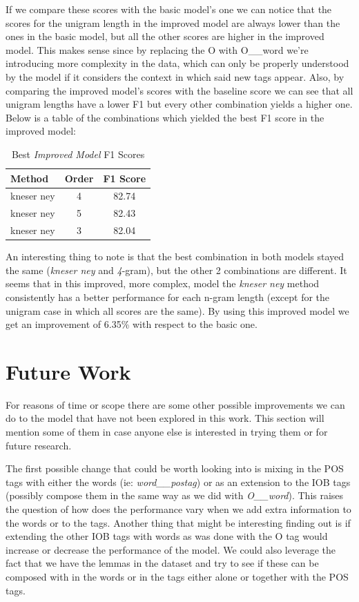 \documentclass[11pt,a4paper]{article}
\begin{document}
	If we compare these scores with the basic model's one we can notice that the scores for the unigram length in the improved model are always lower than the ones in the basic model, but all the other scores are higher in the improved model. This makes sense since by replacing the O with O\_\_word we're introducing more complexity in the data, which can only be properly understood by the model if it considers the context in which said new tags appear. Also, by comparing the improved model's scores with the baseline score we can see that all unigram lengths have a lower F1 but every other combination yields a higher one. Below is a table of the combinations which yielded the best F1 score in the improved model:
	
	\begin{table}[h]
		\centering
		\begin{tabularx}{155pt}{l | c | c}

			\textbf{Method} & \textbf{Order} & \textbf{F1 Score} \\
			\hline 
			kneser ney & 4 & 82.74 \\
			\hline
			kneser ney & 5 & 82.43 \\
			kneser ney & 3 & 82.04 \\

		\end{tabularx} 
		\caption{Best \textit{Improved Model} F1 Scores}
		\label{table:improved-method-scores}	
	\end{table}	
			
	An interesting thing to note is that the best combination in both models stayed the same (\textit{kneser ney} and \textit{4}-gram), but the other 2 combinations are different. It seems that in this improved, more complex, model the \textit{kneser ney} method consistently has a better performance for each n-gram length (except for the unigram case in which all scores are the same). By using this improved model we get an improvement of 6.35\% with respect to the basic one.

\section{Future Work}

	For reasons of time or scope there are some other possible improvements we can do to the model that have not been explored in this work. This section will mention some of them in case anyone else is interested in trying them or for future research.
	
	The first possible change that could be worth looking into is mixing in the POS tags with either the words (ie: \textit{word\_\_postag}) or as an extension to the IOB tags (possibly compose them in the same way as we did with \textit{O\_\_word}). This raises the question of how does the performance vary when we add extra information to the words or to the tags. Another thing that might be interesting finding out is if extending the other IOB tags with words as was done with the O tag would increase or decrease the performance of the model. We could also leverage the fact that we have the lemmas in the dataset and try to see if these can be composed with in the words or in the tags either alone or together with the POS tags.
	
\end{document}
